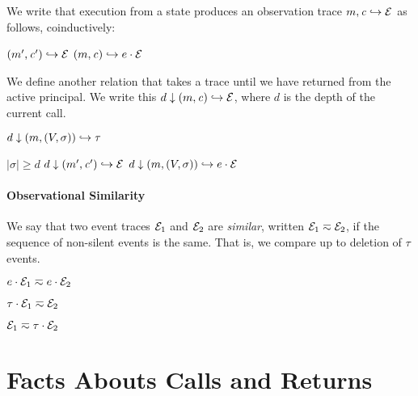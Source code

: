 \documentclass[10pt,conference]{ieeetran}%
\theoremstyle{definition}
\begin{document}
We write that execution from a state produces an observation trace
\(m,\mathit{c} \hookrightarrow \mathcal{E}\) as follows, coinductively:

            {\((m',\mathit{c}') \hookrightarrow \mathcal{E}\)}
            {\((m,\mathit{c}) \hookrightarrow e \cdot \mathcal{E}\)}

We define another relation that takes a trace until we have returned from the
active principal.
We write this \(d \downarrow (m,\mathit{c}) \hookrightarrow \mathcal{E}\), where
\(d\) is the depth of the current call.

         {\(d \downarrow (m,(V,\sigma)) \hookrightarrow \tau\)}

                  {\(|\sigma| \geq d\)}
                  {\(d \downarrow (m',\mathit{c}') \hookrightarrow \mathcal{E}\)}
                  {\(d \downarrow (m,(V,\sigma)) \hookrightarrow e \cdot \mathcal{E}\)}

\paragraph*{Observational Similarity}

We say that two event traces $\mathcal{E}_1$ and $\mathcal{E}_2$ are {\em similar},
written \(\mathcal{E}_1 \eqsim \mathcal{E}_2\), if the sequence of non-silent events
is the same. That is, we compare up to deletion of \(\tau\) events.

\begin{minipage}{.4\columnwidth}
  \judgment{}{\(\obsT \eqsim \obsT\)}
\end{minipage}
\begin{minipage}{.4\columnwidth}
           {\(e \cdot \mathcal{E}_1 \eqsim e \cdot \mathcal{E}_2\)}
\end{minipage}

\begin{minipage}{.4\columnwidth}
           {\(\tau \cdot \mathcal{E}_1 \eqsim \mathcal{E}_2\)}
\end{minipage}
\begin{minipage}{.4\columnwidth}
           {\(\mathcal{E}_1 \eqsim \tau \cdot \mathcal{E}_2\)}
\end{minipage}

\section{Facts Abouts Calls and Returns}
\end{document}
